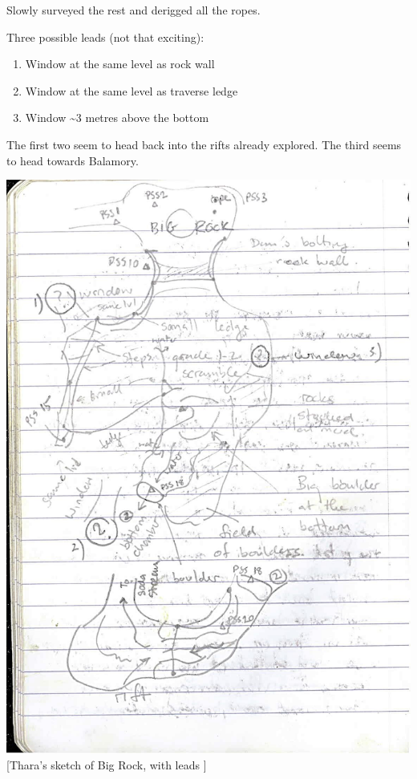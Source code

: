 Slowly surveyed the rest and derigged all the ropes.

Three possible leads (not that exciting):

\begin{enumerate}
\def\labelenumi{\arabic{enumi}.}
\item
  Window at the same level as rock wall
\item
  Window at the same level as traverse ledge
\item
  Window \textasciitilde 3 metres above the bottom
\end{enumerate}

The first two seem to head back into the rifts already explored. The third seems to head towards Balamory.

\includegraphics{2012/uglog/88.jpeg}\\
{[}Thara's sketch of Big Rock, with leads {]}


